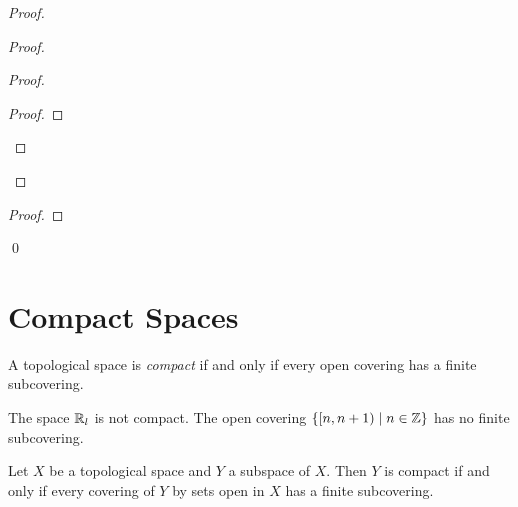 \begin{proof}
\begin{proof}
\begin{proof}
\begin{proof}
            \end{proof}
        \end{proof}
    \end{proof}
    \begin{proof}
    \end{proof}
    \qed
\end{proof}

\section{Compact Spaces}

\begin{definition}[Compact]
    A topological space is \emph{compact} if and only if every open covering has a finite subcovering.
\end{definition}

\begin{example}
    The space $\mathbb{R}_l$ is not compact. The open covering $\{ [n,n+1) \mid n \in \mathbb{Z} \}$ has no finite subcovering.
\end{example}

\begin{lemma}
    \label{lemma:finite_subcovering_subspace}
    Let $X$ be a topological space and $Y$ a subspace of $X$. Then $Y$ is compact if and only if
    every covering of $Y$ by sets open in $X$ has a finite subcovering.
\end{lemma}

